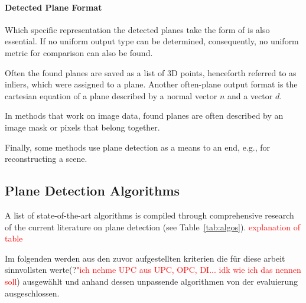 \documentclass[main.tex]{subfiles}
\begin{document}
\paragraph{Detected Plane Format} \label{subsec:planeformat}
Which specific representation the detected planes take the form of is also essential.
If no uniform output type can be determined, consequently, no uniform metric for comparison can also be found.


Often the found planes are saved as a list of 3D points, henceforth referred to as inliers, which were assigned to a plane.
Another often-plane output format is the cartesian equation of a plane described by a normal vector $n$ and a vector $d$.

In methods that work on image data, found planes are often described by an image mask or pixels that belong together.

Finally, some methods use plane detection as a means to an end, e.g., for reconstructing a scene.

\subsection{Plane Detection Algorithms}
\label{subsec:pdaselect}
A list of state-of-the-art algorithms is compiled through comprehensive research of the current literature on plane detection (see Table~\ref{tab:algos}).
\textcolor{red}{explanation of table}

Im folgenden werden aus den zuvor aufgestellten kriterien die für diese arbeit sinnvollsten werte(?\textcolor{red}{"ich nehme UPC aus {UPC, OPC, DI}... idk wie ich das nennen soll}) ausgewählt und anhand dessen unpassende algorithmen von der evaluierung ausgeschlossen.
\end{document}

